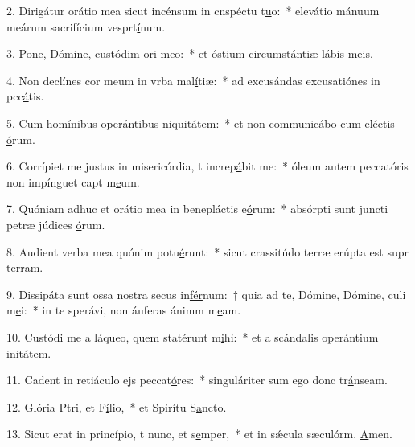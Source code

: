 2. Dirigátur orátio mea sicut incénsum in cnspéctu t\uline{u}o:~* elevátio mánuum meárum sacrifícium vesprt\uline{í}num.\par 
3. Pone, Dómine, custódim ori m\uline{e}o:~* et óstium circumstántiæ lábis m\uline{e}is.\par 
4. Non declínes cor meum in vrba mal\uline{í}tiæ:~* ad excusándas excusatiónes in pcc\uline{á}tis.\par 
5. Cum homínibus operántibus niquit\uline{á}tem:~* et non communicábo cum eléctis \uline{ó}rum.\par 
6. Corrípiet me justus in misericórdia, t increp\uline{á}bit me:~* óleum autem peccatóris non impínguet capt m\uline{e}um.\par 
7. Quóniam adhuc et orátio mea in benepláctis e\uline{ó}rum:~* absórpti sunt juncti petræ júdices \uline{ó}rum.\par 
8. Audient verba mea quónim potu\uline{é}runt:~* sicut crassitúdo terræ erúpta est supr t\uline{e}rram.\par 
9. Dissipáta sunt ossa nostra secus in\uline{fér}num:~† quia ad te, Dómine, Dómine, culi m\uline{e}i:~* in te sperávi, non áuferas ánimm m\uline{e}am.\par 
10. Custódi me a láqueo, quem statérunt m\uline{i}hi:~* et a scándalis operántium init\uline{á}tem.\par 
11. Cadent in retiáculo ejs peccat\uline{ó}res:~* singuláriter sum ego donc tr\uline{á}nseam.\par 
12. Glória Ptri, et F\uline{í}lio,~* et Spirítu S\uline{a}ncto.\par 
13. Sicut erat in princípio, t nunc, et s\uline{e}mper,~* et in sǽcula sæculórm. \uline{A}men.\par 
